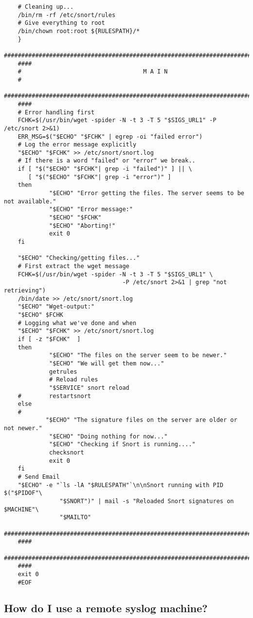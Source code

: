 \documentclass{article}
\begin{document}
\begin{verbatim}
    # Cleaning up...
    /bin/rm -rf /etc/snort/rules
    # Give everything to root
    /bin/chown root:root ${RULESPATH}/*
    }
    ###########################################################################
    ####
    #                                   M A I N                                      
    #
    ###########################################################################
    ####
    # Error handling first
    FCHK=$(/usr/bin/wget -spider -N -t 3 -T 5 "$SIGS_URL1" -P /etc/snort 2>&1)
    ERR_MSG=$("$ECHO" "$FCHK" | egrep -oi "failed error")
    # Log the error message explicitly
    "$ECHO" "$FCHK" >> /etc/snort/snort.log
    # If there is a word "failed" or "error" we break..
    if [ "$("$ECHO" "$FCHK"| grep -i "failed")" ] || \
       [ "$("$ECHO" "$FCHK"| grep -i "error")" ]
    then
             "$ECHO" "Error getting the files. The server seems to be not available."
             "$ECHO" "Error message:"
             "$ECHO" "$FCHK"
             "$ECHO" "Aborting!"
             exit 0
    fi
     
    "$ECHO" "Checking/getting files..."
    # First extract the wget message
    FCHK=$(/usr/bin/wget -spider -N -t 3 -T 5 "$SIGS_URL1" \
                                  -P /etc/snort 2>&1 | grep "not retrieving")
    /bin/date >> /etc/snort/snort.log
    "$ECHO" "Wget-output:"
    "$ECHO" $FCHK
    # Logging what we've done and when
    "$ECHO" "$FCHK" >> /etc/snort/snort.log
    if [ -z "$FCHK"  ]
    then
             "$ECHO" "The files on the server seem to be newer."
             "$ECHO" "We will get them now..."
             getrules
             # Reload rules
             "$SERVICE" snort reload
    #        restartsnort
    else
    #
            "$ECHO" "The signature files on the server are older or not newer."
             "$ECHO" "Doing nothing for now..."
             "$ECHO" "Checking if Snort is running...."
             checksnort
             exit 0
    fi
    # Send Email
    "$ECHO" -e "`ls -lA "$RULESPATH"`\n\nSnort running with PID $("$PIDOF"\
                "$SNORT")" | mail -s "Reloaded Snort signatures on $MACHINE"\
                "$MAILTO"
    ###########################################################################
    ####
    ###########################################################################
    ####
    exit 0
    #EOF
\end{verbatim}

\subsection{How do I use a remote syslog machine?}
\end{document}
